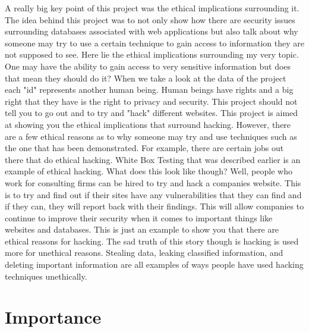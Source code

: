 A really big key point of this project was the ethical implications surrounding it. The idea behind this project was to not only show how there are security issues surrounding databases associated with web applications but also talk about why someone may try to use a certain technique to gain access to information they are not supposed to see. Here lie the ethical implications surrounding my very topic. One may have the ability to gain access to very sensitive information but does that mean they should do it? When we take a look at the data of the project each "id" represents another human being. Human beings have rights and a big right that they have is the right to privacy and security. This project should not tell you to go out and to try and "hack" different websites. This project is aimed at showing you the ethical implications that surround hacking. However, there are a few ethical reasons as to why someone may try and use techniques such as the one that has been demonstrated. For example, there are certain jobs out there that do ethical hacking. White Box Testing that was described earlier is an example of ethical hacking. What does this look like though? Well, people who work for consulting firms can be hired to try and hack a companies website. This is to try and find out if their sites have any vulnerabilities that they can find and if they can, they will report back with their findings. This will allow companies to continue to improve their security when it comes to important things like websites and databases. This is just an example to show you that there are ethical reasons for hacking. The sad truth of this story though is hacking is used more for unethical reasons. Stealing data, leaking classified information, and deleting important information are all examples of ways people have used hacking techniques unethically. 

\section{Importance}

